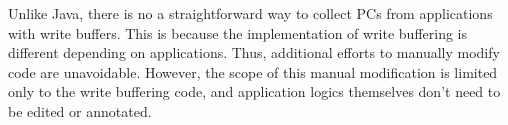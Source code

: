 Unlike Java, there is no a straightforward way to collect PCs from applications
with write buffers. This is because the implementation of write buffering is
different depending on applications. Thus, additional efforts to manually
modify code are unavoidable. However, the scope of this manual modification is
limited only to the write buffering code, and application logics themselves don't
need to be edited or annotated.


